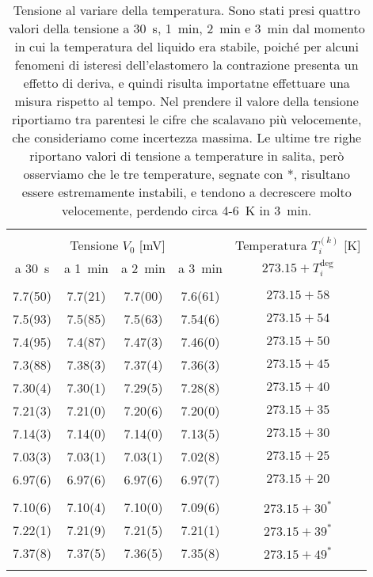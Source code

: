 \begin{table}
    \footnotesize
    \centering
    \caption{Tensione al variare della temperatura. Sono stati presi quattro valori della tensione a 30~s, 1~min, 2~min e 3~min dal momento in cui la temperatura del liquido era stabile, poiché per alcuni fenomeni di isteresi dell'elastomero la contrazione presenta un effetto di deriva, e quindi risulta importatne effettuare una misura rispetto al tempo. Nel prendere il valore della tensione riportiamo tra parentesi le cifre che scalavano più velocemente, che consideriamo come incertezza massima. Le ultime tre righe riportano valori di tensione a temperature in salita, però osserviamo che le tre temperature, segnate con *, risultano essere estremamente instabili, e tendono a decrescere molto velocemente, perdendo circa 4-6~K in 3~min.}
    \label{table:p2}
    \begin{tabular}{ccccc}
        \hline\hline\\[-1.5ex]
        \multicolumn{4}{c}{Tensione $V_0$ [mV]} & Temperatura $T_i^{(k)}$ [K] \\[+0.5ex]
        a 30~s  & a 1~min & a 2~min & a 3~min   & $273.15+T_i^{\text{deg}}$   \\[+0.5ex] \hline \\[-1.5ex]
        7.7(50) & 7.7(21) & 7.7(00) & 7.6(61)   & $273.15+58$                 \\[+0.5ex]
        7.5(93) & 7.5(85) & 7.5(63) & 7.54(6)   & $273.15+54$                 \\[+0.5ex]
        7.4(95) & 7.4(87) & 7.47(3) & 7.46(0)   & $273.15+50$                 \\[+0.5ex]
        7.3(88) & 7.38(3) & 7.37(4) & 7.36(3)   & $273.15+45$                 \\[+0.5ex]
        7.30(4) & 7.30(1) & 7.29(5) & 7.28(8)   & $273.15+40$                 \\[+0.5ex]
        7.21(3) & 7.21(0) & 7.20(6) & 7.20(0)   & $273.15+35$                 \\[+0.5ex]
        7.14(3) & 7.14(0) & 7.14(0) & 7.13(5)   & $273.15+30$                 \\[+0.5ex]
        7.03(3) & 7.03(1) & 7.03(1) & 7.02(8)   & $273.15+25$                 \\[+0.5ex]
        6.97(6) & 6.97(6) & 6.97(6) & 6.97(7)   & $273.15+20$                 \\[+0.5ex] \hline \\[-1.5ex]
        7.10(6) & 7.10(4) & 7.10(0) & 7.09(6)   & $273.15+30^*$               \\[+0.5ex]
        7.22(1) & 7.21(9) & 7.21(5) & 7.21(1)   & $273.15+39^*$               \\[+0.5ex]
        7.37(8) & 7.37(5) & 7.36(5) & 7.35(8)   & $273.15+49^*$               \\[+0.5ex] \hline \\[-1.5ex]
    \end{tabular}
\end{table}